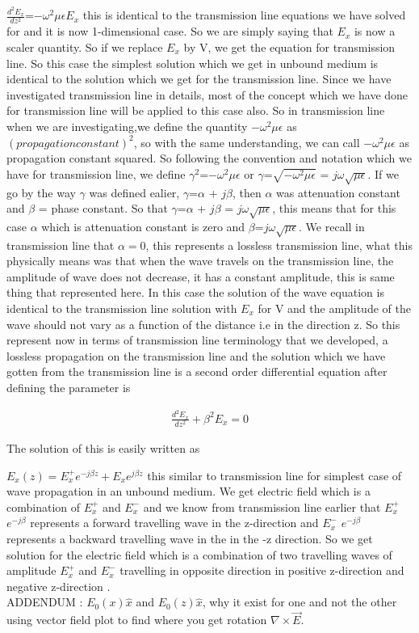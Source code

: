 			$\frac{d^2 E_x}{d z^2}$=$-\omega^2\mu\epsilon E_{x}$ this is identical to the transmission line equations we have solved for and it is now 1-dimensional case. So we are simply saying that $E_x$ is now a scaler quantity. So if we replace  $E_x$ by V, we get the equation for transmission line. So  this case the simplest solution which we get in unbound medium is identical to the solution which we get for the transmission line. Since we have investigated transmission line in details, most of the concept which we have done for transmission line will be applied to this case also. So in transmission line when we are investigating,we define the quantity $-\omega^2\mu\epsilon$ as $(propagation constant)^2$,  so with the same understanding, we can call $-\omega^2\mu\epsilon$ as  propagation constant squared. So following the convention and notation which we have for transmission line, we define $\gamma^2$=$-\omega^2\mu\epsilon$ or $\gamma$=$\sqrt{-\omega^2\mu\epsilon}$ = $j\omega\sqrt{\mu\epsilon}$. If we go by the way $\gamma$ was defined ealier, $\gamma$=$\alpha$ + $j\beta$, then $\alpha$ was attenuation constant and $\beta$ = phase constant. So that  $\gamma$=$\alpha$ + $j\beta$ = $j\omega\sqrt{\mu\epsilon}$, this means that for this case $\alpha$ which is attenuation constant is zero and    $\beta$=$j\omega\sqrt{\mu\epsilon}$.
			We recall in transmission line that $\alpha=0$, this represents a lossless transmission line, what this physically means was that  when the wave travels on the transmission line, the amplitude of wave does not decrease, it has a constant amplitude, this is same thing that represented here. In this case the solution of the wave equation is identical to the transmission line solution with $E_x$ for V and the amplitude of the wave should not vary as a function of the distance i.e in the direction z. So this represent now in terms of transmission line terminology that we developed, a lossless propagation on the transmission line and the solution which we have gotten from the transmission line is a second order differential equation after defining the parameter is
			
			\bigskip
			\begin{align}
			\frac{d^2E_x}{dz^2}+\beta^2E_x=0
			\end{align}
		
			\bigskip
			
			The solution of this is easily written as
			
			$E_x(z)=E^+_xe^{-j\beta z}+E_xe^{j\beta z}$  this similar to transmission line for simplest case of wave propagation in an unbound medium.
			We get electric field which is a combination of $E_x^+$ and  $E_x^-$ and we know from transmission line earlier that  $E_x^+$ $e^{-j\beta}$ represents a forward travelling wave in the z-direction and  $E_x^-$ $e^{-j\beta}$ represents a backward travelling wave in the in the -z direction. So we get solution for the electric field which is a combination of two travelling waves of amplitude $E_x^+$ and $E_x^-$ travelling in opposite direction in positive z-direction and negative z-direction .\\
			
			ADDENDUM : $E_0(x)\hat{x}$ and $E_0(z)\hat{x}$, why it exist for one and not the other using vector field plot to find where you get rotation $\nabla\times\vec{E}$.     \\